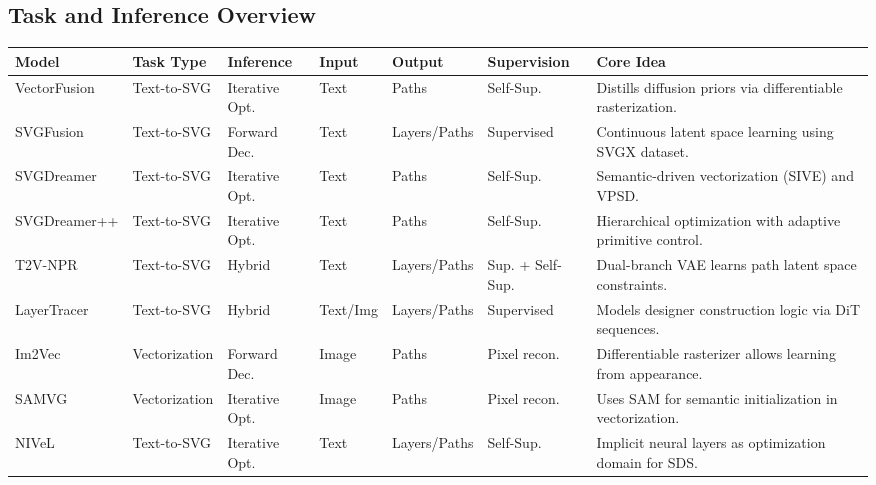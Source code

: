 \begin{landscape}
\section{Task and Inference Overview}
\label{app:task_overview}

\begin{center}
\small
{}
\label{tab:app_task_overview}
\begin{tabularx}{\linewidth}{>{\raggedright\arraybackslash}p{2.85cm} >{\raggedright\arraybackslash}p{2.32cm} >{\raggedright\arraybackslash}p{2.10cm} >{\raggedright\arraybackslash}p{1.45cm} >{\raggedright\arraybackslash}p{2.35cm} >{\raggedright\arraybackslash}p{2.35cm} >{\raggedright\arraybackslash}X}
\toprule
\textbf{Model} & \textbf{Task Type} & \textbf{Inference} & \textbf{Input} & \textbf{Output} & \textbf{Supervision} & \textbf{Core Idea} \\
\midrule
VectorFusion & Text-to-SVG & Iterative Opt. & Text & Paths & Self-Sup. & Distills diffusion priors via differentiable rasterization. \\
        SVGFusion & Text-to-SVG & Forward Dec. & Text & Layers/Paths & Supervised & Continuous latent space learning using SVGX dataset. \\
        SVGDreamer & Text-to-SVG & Iterative Opt. & Text & Paths & Self-Sup. & Semantic-driven vectorization (SIVE) and VPSD. \\
        SVGDreamer++ & Text-to-SVG & Iterative Opt. & Text & Paths & Self-Sup. & Hierarchical optimization with adaptive primitive control. \\
        T2V-NPR & Text-to-SVG & Hybrid & Text & Layers/Paths & Sup. + Self-Sup. & Dual-branch VAE learns path latent space constraints. \\
        LayerTracer & Text-to-SVG & Hybrid & Text/Img & Layers/Paths & Supervised & Models designer construction logic via DiT sequences. \\
        Im2Vec & Vectorization & Forward Dec. & Image & Paths & Pixel recon. & Differentiable rasterizer allows learning from appearance. \\
        SAMVG & Vectorization & Iterative Opt. & Image & Paths & Pixel recon. & Uses SAM for semantic initialization in vectorization. \\
        NIVeL & Text-to-SVG & Iterative Opt. & Text & Layers/Paths & Self-Sup. & Implicit neural layers as optimization domain for SDS. \\

\end{tabularx}
\end{center}
\end{landscape}
